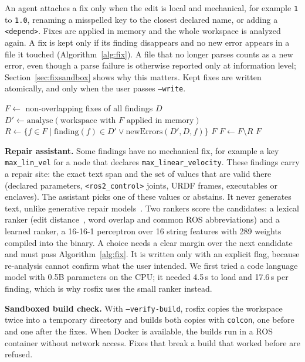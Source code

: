 \documentclass[conference]{IEEEtran}
\newcommand{\code}[1]{\texttt{#1}}
\begin{document}
An agent attaches a fix only when the edit is local and mechanical, for example \code{1} to
\code{1.0}, renaming a misspelled key to the closest declared name, or adding a
\code{<depend>}. Fixes are applied in memory and the whole workspace is analyzed again. A fix is
kept only if its finding disappears and no new error appears in a file it touched
(Algorithm~\ref{alg:fix}). A file that no longer parses counts as a new error, even though a
parse failure is otherwise reported only at information level; Section~\ref{sec:fixsandbox} shows
why this matters. Kept fixes are written atomically, and only when the user passes
\code{--write}.

\begin{algorithm}[t]
\caption{Fix verification}
\label{alg:fix}
\footnotesize
\begin{algorithmic}[1]
\State $F \gets$ non-overlapping fixes of all findings $D$
  \State $D' \gets \mathrm{analyse}(\text{workspace with } F \text{ applied in memory})$
  \State $R \gets \{f\in F \mid \mathrm{finding}(f)\in D' \lor \mathrm{newErrors}(D', D, f)\}$
   \Return $F$ \EndIf
  \State $F \gets F \setminus R$
\EndFor
\State \Return $F$
\end{algorithmic}
\end{algorithm}

\textbf{Repair assistant.} Some findings have no mechanical fix, for example a key
\code{max\_lin\_vel} for a node that declares \code{max\_linear\_velocity}. These findings carry
a repair site: the exact text span and the set of values that are valid there (declared
parameters, \code{<ros2\_control>} joints, URDF frames, executables or enclaves). The assistant
picks one of these values or abstains. It never generates text, unlike generative repair
models~\cite{silva2023repairllama,wang2023rapgen}. Two rankers score the candidates: a lexical
ranker (edit distance~\cite{levenshtein1966}, word overlap and common ROS abbreviations) and a learned ranker, a
16-16-1 perceptron over 16 string features with 289 weights compiled into the binary. A choice
needs a clear margin over the next candidate and must pass Algorithm~\ref{alg:fix}. It is written
only with an explicit flag, because re-analysis cannot confirm what the user intended. We first
tried a code language model with 0.5B parameters on the CPU; it needed 4.5\,s to load and
17.6\,s per finding, which is why rosfix uses the small ranker instead.

\textbf{Sandboxed build check.} With \code{--verify-build}, rosfix copies the workspace twice
into a temporary directory and builds both copies with \code{colcon}, one before and one after
the fixes. When Docker is available, the builds run in a ROS container without network access.
Fixes that break a build that worked before are refused.
\end{document}
